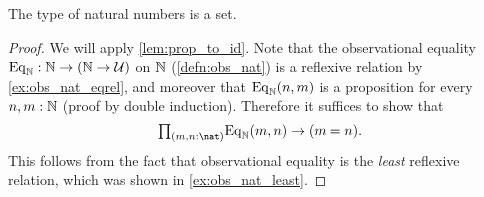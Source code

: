 \begin{thm}\label{thm:eq_nat}
The type of natural numbers is a set.
\end{thm}

\begin{proof}
We will apply \cref{lem:prop_to_id}. Note that the observational equality $\mathrm{Eq}_\mathbb{N}:\mathbb{N}\to(\mathbb{N}\to\mathcal{U})$ on $\mathbb{N}$ (\cref{defn:obs_nat}) is a reflexive relation by \cref{ex:obs_nat_eqrel}, and moreover that $\mathrm{Eq}_\mathbb{N}(n,m)$ is a proposition for every $n,m:\mathbb{N}$ (proof by double induction).
Therefore it suffices to show that
\begin{equation*}
\prd{m,n:\nat}\mathrm{Eq}_\N(m,n)\to (\id{m}{n}).
\end{equation*}
This follows from the fact that observational equality is the \emph{least} reflexive relation, which was shown in \cref{ex:obs_nat_least}.
\end{proof}

\begin{comment}
\begin{thm}[Hedberg]\label{thm:dec_eq}
Any type with decidable equality is a set.
\end{thm}

\begin{proof}
Let $A$ be a type, and let $d:\prd{x,y:A}(\id{x}{y})+\neg(\id{x}{y})$ be the witness that $A$ has decidable equality.
We first construct a reflexive binary relation $E:A\to A\to\type$ such that each $E(x,y)$ is a proposition.
For every $x,y:A$, we first define a type family $E'(x,y):((\id{x}{y})+\neg(\id{x}{y}))\to\type$ by
\begin{align*}
E'(x,y,\inl(p)) & \defeq \unit \\
E'(x,y,\inr(p)) & \defeq \emptyt.
\end{align*}
Note that $E'(x,y,q)$ is a proposition for each $x,y:A$ and $q:(\id{x}{y})+\neg(\id{x}{y})$. 
Now we set $E(x,y)\defeq E'(x,y,d(x,y))$. Then $E$ is clearly reflexive, and a family of propositions.
Therefore it remains to show that $E$ implies identity. 

Since $E$ is defined as an instance of $E'$, it suffices to construct a term of type
\begin{equation*}
\prd{x,y:A}{q:(\id{x}{y})+\neg(\id{x}{y})} E'(q)\to (\id{x}{y}). 
\end{equation*}
By induction of disjoint sums, it suffices to construct terms of types
\begin{align*}
& \prd{x,y:A}{p:\id{x}{y}} \unit\to (\id{x}{y}) \\
& \prd{x,y:A}{p:\neg(\id{x}{y})} \emptyt\to (\id{x}{y}).
\end{align*}
In the first case, we take $\lam{x}{y}{p}{t}p$, and the second case is by induction on the empty type.
\end{proof}
\end{comment}

